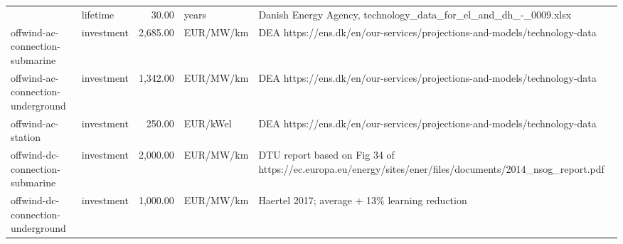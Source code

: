 \begin{longtable}{p{5cm}p{3cm}rp{3cm}p{11cm}}
                      & lifetime &          30.00 &                             years &                                                                                                                                                                                                                                                                      Danish Energy Agency, technology\_data\_for\_el\_and\_dh\_-\_0009.xlsx \\
offwind-ac-connection-submarine & investment &       2,685.00 &                         EUR/MW/km &                                                                                                                                                                                                                                                            DEA https://ens.dk/en/our-services/projections-and-models/technology-data \\
offwind-ac-connection-underground & investment &       1,342.00 &                         EUR/MW/km &                                                                                                                                                                                                                                                            DEA https://ens.dk/en/our-services/projections-and-models/technology-data \\
offwind-ac-station & investment &         250.00 &                          EUR/kWel &                                                                                                                                                                                                                                                            DEA https://ens.dk/en/our-services/projections-and-models/technology-data \\
offwind-dc-connection-submarine & investment &       2,000.00 &                         EUR/MW/km &                                                                                                                                                                                                                            DTU report based on Fig 34 of https://ec.europa.eu/energy/sites/ener/files/documents/2014\_nsog\_report.pdf \\
offwind-dc-connection-underground & investment &       1,000.00 &                         EUR/MW/km &                                                                                                                                                                                                                                                                                       Haertel 2017; average + 13\% learning reduction \\

\end{longtable}
